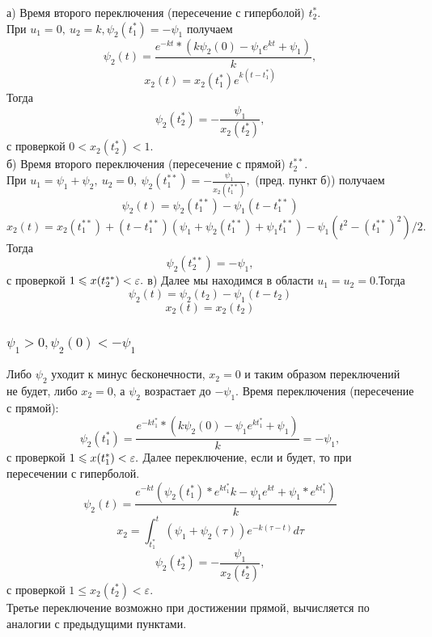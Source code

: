 \documentclass[12pt, fleqn]{article}
\begin{document}
а) Время второго переключения (пересечение с гиперболой) $t_2^*$.\\
При $ u_1 = 0, \ u_2 = k, \psi_2(t_1^*) = - \psi_1$ получаем
\begin{equation}
\psi_2(t) = \frac{e^{-kt}*(k\psi_2(0) - \psi_1e^{kt} + \psi_1)}{k},
\end{equation}
\begin{equation}
x_2(t) = x_2(t_1^*)e^{k(t - t_1^*)}
\end{equation}
Тогда
\begin{equation}
\psi_2(t_2^*) = -\frac{\psi_1}{x_2(t_2^*)},
\end{equation}
с проверкой  $ 0 < x_2(t_2^*) < 1.$\\
б) Время второго переключения (пересечение с прямой) $t_2^{**}.$\\
При $u_1 = \psi_1 + \psi_2, \ u_2 = 0, \  \psi_2(t_1^{**}) = -\frac{\psi_1}{x_2(t_1^{**})},$ (пред. пункт б)) получаем
\begin{equation}
\psi_2(t) = \psi_2(t_1^{**}) - \psi_1(t - t_1^{**})
\end{equation}
\begin{equation}
x_2(t) = x_2(t_1^{**}) + (t - t_1^{**})(\psi_1 + \psi_2(t_1^{**}) + \psi_1t_1^{**}) -\psi_1(t^2 - (t_1^{**})^2)/2.
\end{equation}
Тогда
\begin{equation}
\psi_2(t_2^{**}) = - \psi_1, 
\end{equation}
с проверкой $1 \leqslant x(t_2^{**}) < \varepsilon.\\$
в) Далее мы находимся в области $u_1 = u_2 = 0$.Тогда
\begin{equation}
\psi_2(t) = \psi_2(t_2) - \psi_1(t - t_2)
\end{equation}
\begin{equation}
x_2(t) = x_2(t_2)
\end{equation}
\subsubsection{$\psi_1 > 0, \psi_2(0) < -\psi_1$}
Либо  $\psi_2$ уходит к минус бесконечности, $x_2 = 0$ и таким образом переключений не будет, либо $x_2 = 0$, а $\psi_2$ возрастает до $-\psi_1$. Время переключения (пересечение с прямой):
\begin{equation}
\psi_2(t_1^*) = \frac{e^{-kt_1^*}*(k\psi_2(0) - \psi_1e^{kt_1^*} + \psi_1)}{k} = -\psi_1,
\end{equation}
с проверкой $1 \leqslant x(t_1^{*}) < \varepsilon.\\$
Далее переключение, если и будет, то при пересечении с гиперболой.
\begin{equation}
\psi_2(t) = \frac{e^{-kt}(\psi_2(t_1^*)*e^{kt_1^*}k - \psi_1e^{kt} + \psi_1*e^{kt_1^*})}{k}
\end{equation}
\begin{equation}
x_2 = \int_{t_1^*}^t{(\psi_1 + \psi_2(\tau))e^{-k(\tau - t)}}d\tau
\end{equation}
$$\psi_2(t_2^{*}) = -\frac{\psi_1}{x_2(t_2^{*})},$$ с проверкой $1 \leqslant x_2(t_2^*) <\varepsilon.$\\
Третье переключение возможно при достижении прямой, вычисляется по аналогии с предыдущими пунктами.
\end{document}
